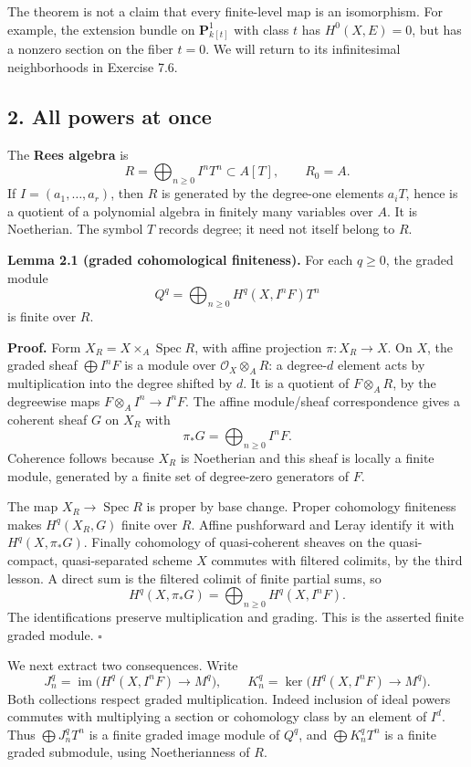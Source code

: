 \documentclass[11pt]{article}
\begin{document}
The theorem is not a claim that every finite-level map is an
isomorphism. For example, the extension bundle on \(\mathbf P^1_{k[t]}\)
with class \(t\) has \(H^0(X,E)=0\), but has a nonzero section on the
fiber \(t=0\). We will return to its infinitesimal neighborhoods in
Exercise 7.6.

\subsection{2. All powers at once}\label{all-powers-at-once}

The \textbf{Rees algebra} is \[
R=\bigoplus_{n\geq0}I^nT^n\subset A[T],\qquad R_0=A.
\] If \(I=(a_1,\ldots,a_r)\), then \(R\) is generated by the degree-one
elements \(a_iT\), hence is a quotient of a polynomial algebra in
finitely many variables over \(A\). It is Noetherian. The symbol \(T\)
records degree; it need not itself belong to \(R\).

\textbf{Lemma 2.1 (graded cohomological finiteness).} For each
\(q\geq0\), the graded module \[
Q^q=\bigoplus_{n\geq0}H^q(X,I^nF)T^n
\] is finite over \(R\).

\textbf{Proof.} Form \(X_R=X\times_A\operatorname{Spec}R\), with affine
projection \(\pi:X_R\to X\). On \(X\), the graded sheaf
\(\bigoplus I^nF\) is a module over \(\mathcal O_X\otimes_A R\): a
degree-\(d\) element acts by multiplication into the degree shifted by
\(d\). It is a quotient of \(F\otimes_A R\), by the degreewise maps
\(F\otimes_A I^n\to I^nF\). The affine module/sheaf correspondence gives
a coherent sheaf \(G\) on \(X_R\) with \[
\pi_*G=\bigoplus_{n\geq0}I^nF.
\] Coherence follows because \(X_R\) is Noetherian and this sheaf is
locally a finite module, generated by a finite set of degree-zero
generators of \(F\).

The map \(X_R\to\operatorname{Spec}R\) is proper by base change. Proper
cohomology finiteness makes \(H^q(X_R,G)\) finite over \(R\). Affine
pushforward and Leray identify it with \(H^q(X,\pi_*G)\). Finally
cohomology of quasi-coherent sheaves on the quasi-compact,
quasi-separated scheme \(X\) commutes with filtered colimits, by the
third lesson. A direct sum is the filtered colimit of finite partial
sums, so \[
H^q(X,\pi_*G)=\bigoplus_{n\geq0}H^q(X,I^nF).
\] The identifications preserve multiplication and grading. This is the
asserted finite graded module. \(\square\)

We next extract two consequences. Write \[
J_n^q=\operatorname{im}\bigl(H^q(X,I^nF)\to M^q\bigr),
\qquad K_n^q=\ker\bigl(H^q(X,I^nF)\to M^q\bigr).
\] Both collections respect graded multiplication. Indeed inclusion of
ideal powers commutes with multiplying a section or cohomology class by
an element of \(I^d\). Thus \(\bigoplus J_n^qT^n\) is a finite graded
image module of \(Q^q\), and \(\bigoplus K_n^qT^n\) is a finite graded
submodule, using Noetherianness of \(R\).
\end{document}
